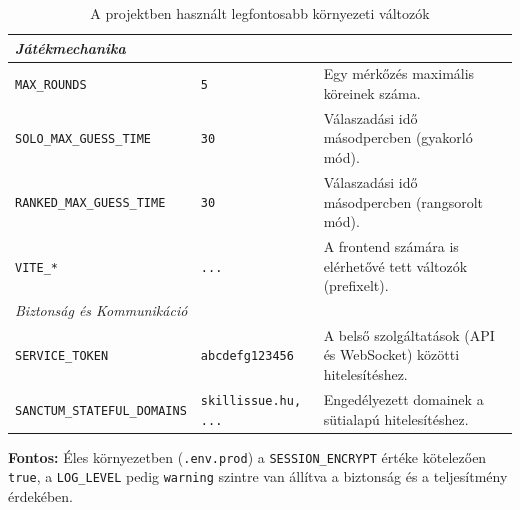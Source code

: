 \begin{table}[h!]
\begin{tabularx}{\textwidth}{|l|X|X|}
        \multicolumn{3}{|l|}{\cellcolor[HTML]{F5F5F5}\textit{Játékmechanika}} \\ \hline
        \texttt{MAX\_ROUNDS} & \texttt{5} & Egy mérkőzés maximális köreinek száma. \\ \hline
        \texttt{SOLO\_MAX\_GUESS\_TIME} & \texttt{30} & Válaszadási idő másodpercben (gyakorló mód). \\ \hline
        \texttt{RANKED\_MAX\_GUESS\_TIME} & \texttt{30} & Válaszadási idő másodpercben (rangsorolt mód). \\ \hline
        \texttt{VITE\_*} & \texttt{...} & A frontend számára is elérhetővé tett változók (prefixelt). \\ \hline
        
        \multicolumn{3}{|l|}{\cellcolor[HTML]{F5F5F5}\textit{Biztonság és Kommunikáció}} \\ \hline
        \texttt{SERVICE\_TOKEN} & \texttt{abcdefg123456} & A belső szolgáltatások (API és WebSocket) közötti hitelesítéshez. \\ \hline
        \texttt{SANCTUM\_STATEFUL\_DOMAINS} & \texttt{skillissue.hu, ...} & Engedélyezett domainek a sütialapú hitelesítéshez. \\ \hline
    \end{tabularx}
    \caption{A projektben használt legfontosabb környezeti változók}
\end{table}

\noindent \textbf{Fontos:} Éles környezetben (\texttt{.env.prod}) a \texttt{SESSION\_ENCRYPT} értéke kötelezően \texttt{true}, a \texttt{LOG\_LEVEL} pedig \texttt{warning} szintre van állítva a biztonság és a teljesítmény érdekében.